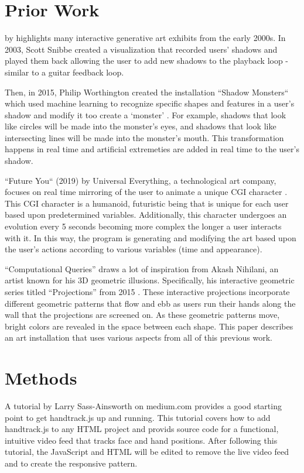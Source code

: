 \documentclass[10pt,twocolumn]{article}
\begin{document}
\section{Prior Work}

 by \citeauthor{kwon_real-time_nodate} highlights many interactive generative art exhibits from the early 2000s. In 2003, Scott Snibbe created a visualization that recorded users' shadows and played them back allowing the user to add new shadows to the playback loop - similar to a guitar feedback loop.  

Then, in 2015, Philip Worthington created the installation ``Shadow Monsters`` which used machine learning to recognize specific shapes and features in a user's shadow and modify it too create a `monster' \cite{houston_public_media_mfah_2015}.  For example, shadows that look like circles will be made into the monster's eyes, and shadows that look like intersecting lines will be made into the monster's mouth.  This transformation happens in real time and artificial extremeties are added in real time to the user's shadow.

``Future You`` (2019) by Universal Everything, a technological art company, focuses on real time mirroring of the user to animate a unique CGI character \cite{noauthor_future_2019}. This CGI character is a humanoid, futuristic being that is unique for each user based upon predetermined variables. Additionally, this character undergoes an evolution every 5 seconds becoming more complex the longer a user interacts with it.  In this way, the program is generating and modifying the art based upon the user's actions according to various variables (time and appearance).  

``Computational Queries'' draws a lot of inspiration from Akash Nihilani, an artist known for his 3D geometric illusions. Specifically, his interactive geometric series titled ``Projections'' from 2015 \cite{}.  These interactive projections incorporate different geometric patterns that flow and ebb as users run their hands along the wall that the projections are screened on. As these geometric patterns move, bright colors are revealed in the space between each shape.  This paper describes an art installation that uses various aspects from all of this previous work. 

\section{Methods}
 A tutorial by Larry Sass-Ainsworth on medium.com \cite{} provides a good starting point to get handtrack.js up and running.  This tutorial covers how to add handtrack.js to any HTML project and provids source code for a functional, intuitive video feed that tracks face and hand positions. After following this tutorial, the JavaScript and HTML will be edited to remove the live video feed and to create the responsive pattern.  
\end{document}
